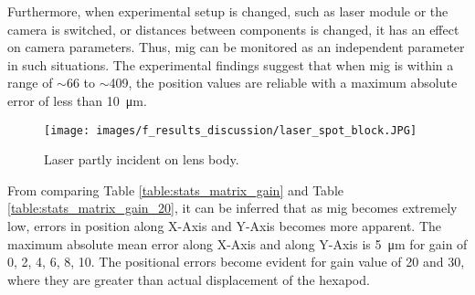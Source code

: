 \vspace{5mm}
\noindent Furthermore, when experimental setup is changed, such as laser module or the camera is switched, or distances between components is changed, it has an effect on camera parameters. Thus, \gls{mig} can be monitored as an independent parameter in such situations. The experimental findings suggest that when \gls{mig} is within a range of $\sim$66 to $\sim$409, the position values are reliable with a maximum absolute error of less than \SI{10}{\micro\meter}.

\vspace{5mm}

\begin{figure}[h]
    \centering
    \texttt{[image: images/f\_results\_discussion/laser\_spot\_block.JPG]}
    \caption{Laser partly incident on lens body.}
    \label{fig:laser_spot_block.JPG}
\end{figure}

\vspace{10mm}
\noindent From comparing Table \ref{table:stats_matrix_gain} and Table \ref{table:stats_matrix_gain_20}, it can be inferred that as \gls{mig} becomes extremely low, errors in position along X-Axis and Y-Axis becomes more apparent. The maximum absolute mean error along X-Axis and along Y-Axis is \SI{5}{\micro\meter} for gain of 0, 2, 4, 6, 8, 10. The positional errors become evident for gain value of 20 and 30, where they are greater than actual displacement of the hexapod.